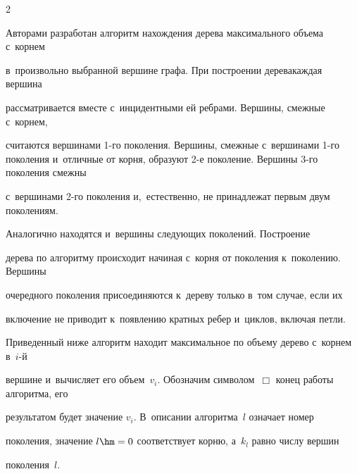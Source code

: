 \begin{multicols}{2}
\begin{figure}[b]
\begin{center}
\end{center}


\vspace*{-9pt}




\end{figure}





Авторами разработан алгоритм нахождения дерева максимального объема с~корнем 


в~произвольно выбранной вершине графа. При построении  дерева\linebreak каждая вершина 


рассматривается вместе с~инцидентными ей ребрами. Вершины, смежные с~корнем, 


считаются вершинами 1-го поколения. Вершины, смежные с~вершинами 1-го поколения и~\mbox{отличные} от корня, образуют 2-е поколение. Вершины 3-го поколения смежны 


с~вершинами 2-го поколения и,~естественно, не принадлежат первым двум поколениям. 


Аналогично находятся и~вершины следующих поколений. Построение 


дерева по алгоритму происходит начиная с~корня от поколения к~поколению. Вершины 


очередного поколения присоединяются к~дереву только в~том случае, если их 


включение не приводит к~появлению кратных ребер и~циклов, включая петли.





Приведенный ниже алгоритм находит максимальное по объему дерево с~корнем в~$i$-й 


вершине и~вычисляет его объем~$v_i$. Обозначим символом~$\Box$ конец работы алгоритма, его 


результатом будет значение $v_i$. В~описании алгоритма~$l$ означает номер 


поколения, значение $l\hm=0$ соответствует корню, а~$k_l$ равно числу вершин 


поколения~$l$.









\noindent 



\end{multicols}
